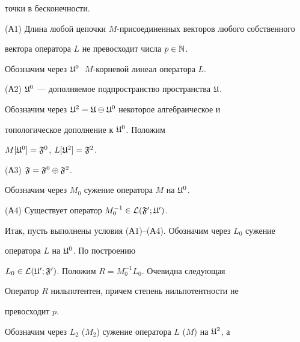 точки в бесконечности. 


 


(А1) Длина любой цепочки $M$-присоединенных векторов любого собственного 


вектора оператора $L$ не превосходит числа $p\in\Bbb N$. 


 


Обозначим через $\frak U^0\;$ $M$-корневой линеал оператора $L$. 





(А2) $\frak U^0$ --- дополняемое подпространство пространства $\frak U$. 


 


Обозначим через $\frak U^2=\frak U\ominus\frak U^0$ некоторое алгебраическое и 


топологическое дополнение к $\frak U^0$. Положим 


$M[\frak U^0]=\frak F^0$, $L[\frak U^2]=\frak F^2$. 


 


(А3) $\frak F=\frak F^0\oplus\frak F^2$. 


 


Обозначим через $M_0$ сужение оператора $M$ на $\frak U^0$. 


 


(А4) Существует оператор $M_0^{-1}\in\cal L(\frak F^0;\frak U^0)$. 


 


Итак, пусть выполнены условия (А1)--(А4). Обозначим через $L_0$ сужение 


оператора $L$ на $\frak U^0$. По построению 


$L_0\in\cal L(\frak U^0;\frak F^0)$. Положим $R=M_0^{-1}L_0$. Очевидна следующая 


 




\begin{lems} Оператор $R$ нильпотентен, причем степень нильпотентности не 


превосходит $p$. 


\end{lems} 


 


Обозначим через $L_2$ ($M_2$) сужение оператора $L$ ($M$) на $\frak U^2$, а 



